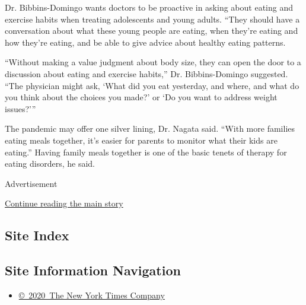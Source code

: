 Dr. Bibbins-Domingo wants doctors to be proactive in asking about eating
and exercise habits when treating adolescents and young adults. ``They
should have a conversation about what these young people are eating,
when they're eating and how they're eating, and be able to give advice
about healthy eating patterns.

``Without making a value judgment about body size, they can open the
door to a discussion about eating and exercise habits,'' Dr.
Bibbins-Domingo suggested. ``The physician might ask, `What did you eat
yesterday, and where, and what do you think about the choices you made?'
or `Do you want to address weight issues?'''

The pandemic may offer one silver lining, Dr. Nagata said. ``With more
families eating meals together, it's easier for parents to monitor what
their kids are eating.'' Having family meals together is one of the
basic tenets of therapy for eating disorders, he said.

Advertisement

\protect\hyperlink{after-bottom}{Continue reading the main story}

\hypertarget{site-index}{%
\subsection{Site Index}\label{site-index}}

\hypertarget{site-information-navigation}{%
\subsection{Site Information
Navigation}\label{site-information-navigation}}

\begin{itemize}
\tightlist
\item
  \href{https://help.nytimes3xbfgragh.onion/hc/en-us/articles/115014792127-Copyright-notice}{©~2020~The
  New York Times Company}
\end{itemize}

